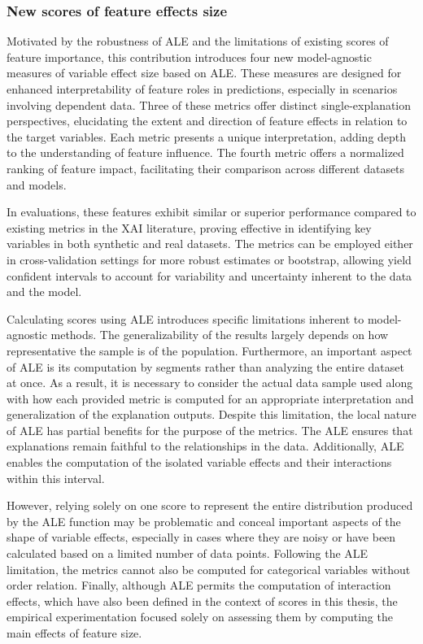 \subsubsection{New scores of feature effects size}

Motivated by the robustness of ALE and the limitations of existing scores of feature importance, this contribution introduces four new model-agnostic measures of variable effect size based on ALE. These measures are designed for enhanced interpretability of feature roles in predictions, especially in scenarios involving dependent data. Three of these metrics offer distinct single-explanation perspectives, elucidating the extent and direction of feature effects in relation to the target variables. Each metric presents a unique interpretation, adding depth to the understanding of feature influence. The fourth metric offers a normalized ranking of feature impact, facilitating their comparison across different datasets and models. 

In evaluations, these features exhibit similar or superior performance compared to existing metrics in the XAI literature, proving effective in identifying key variables in both synthetic and real datasets. The metrics can be employed either in cross-validation settings for more robust estimates or bootstrap, allowing yield confident intervals to account for variability and uncertainty inherent to the data and the model.

Calculating scores using ALE introduces specific limitations inherent to model-agnostic methods. The generalizability of the results largely depends on how representative the sample is of the population. Furthermore, an important aspect of ALE is its computation by segments rather than analyzing the entire dataset at once. As a result, it is necessary to consider the actual data sample used along with how each provided metric is computed for an appropriate interpretation and generalization of the explanation outputs. Despite this limitation, the local nature of ALE has partial benefits for the purpose of the metrics. The ALE ensures that explanations remain faithful to the relationships in the data. Additionally, ALE enables the computation of the isolated variable effects and their interactions within this interval.

However, relying solely on one score to represent the entire distribution produced by the ALE function may be problematic and conceal important aspects of the shape of variable effects, especially in cases where they are noisy or have been calculated based on a limited number of data points. Following the ALE limitation, the metrics cannot also be computed for categorical variables without order relation. Finally, although ALE permits the computation of interaction effects, which have also been defined in the context of scores in this thesis, the empirical experimentation focused solely on assessing them by computing the main effects of feature size.

